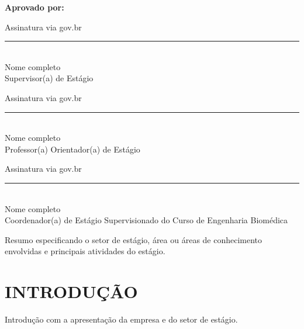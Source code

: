 \documentclass[12pt]{article}
\begin{document}
\textbf{Aprovado por:}

\vspace{1cm}

\begin{center}
    \begin{minipage}[t]{0.45\textwidth}
        \centering
        {\color{red} Assinatura via gov.br} \\[0.2cm]
        \rule{6cm}{0.4pt} \\[0.2cm]
        {\color{red} Nome completo} \\
        Supervisor(a) de Estágio
    \end{minipage}
    \hfill
    \begin{minipage}[t]{0.45\textwidth}
        \centering
        {\color{red} Assinatura via gov.br} \\[0.2cm]
        \rule{6cm}{0.4pt} \\[0.2cm]
        {\color{red} Nome completo} \\
        Professor(a) Orientador(a) de Estágio
    \end{minipage}

    \vspace{1.5cm}

    \begin{minipage}[t]{0.7\textwidth}
        \centering
        {\color{red} Assinatura via gov.br} \\[0.2cm]
        \rule{8cm}{0.4pt} \\[0.2cm]
        {\color{red} Nome completo} \\
        Coordenador(a) de Estágio Supervisionado do Curso de Engenharia Biomédica
    \end{minipage}
\end{center}

\newpage


{\color{red}
\begin{justify}
Resumo especificando o setor de estágio, área ou áreas de conhecimento envolvidas e principais atividades do estágio. 
\end{justify}
}

\newpage

\tableofcontents
\thispagestyle{empty}

\newpage
\section{INTRODUÇÃO}
{\color{red}
\begin{justify}
    Introdução com a apresentação da empresa e do setor de estágio.
\end{justify}
}
\end{document}
